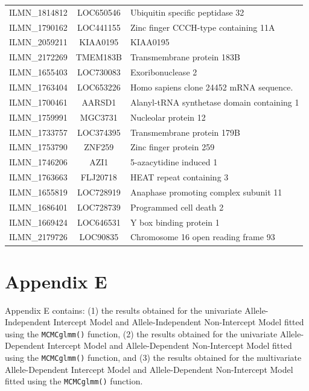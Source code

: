 \begin{xltabular}[!htb]{\textwidth}{|c|c|X|}
  ILMN\_1814812 & LOC650546 & Ubiquitin specific peptidase 32 \\ 
  ILMN\_1790162 & LOC441155 & Zinc finger CCCH-type containing 11A \\ 
  ILMN\_2059211 & KIAA0195 & KIAA0195 \\ 
  ILMN\_2172269 & TMEM183B & Transmembrane protein 183B \\ 
  ILMN\_1655403 & LOC730083 & Exoribonuclease 2 \\ 
  ILMN\_1763404 & LOC653226 & Homo sapiens clone 24452 mRNA sequence. \\ 
  ILMN\_1700461 & AARSD1 & Alanyl-tRNA synthetase domain containing 1 \\ 
  ILMN\_1759991 & MGC3731 & Nucleolar protein 12 \\ 
  ILMN\_1733757 & LOC374395 & Transmembrane protein 179B \\ 
  ILMN\_1753790 & ZNF259 & Zinc finger protein 259 \\ 
  ILMN\_1746206 & AZI1 & 5-azacytidine induced 1 \\ 
  ILMN\_1763663 & FLJ20718 & HEAT repeat containing 3 \\ 
  ILMN\_1655819 & LOC728919 & Anaphase promoting complex subunit 11 \\ 
  ILMN\_1686401 & LOC728739 & Programmed cell death 2 \\ 
  ILMN\_1669424 & LOC646531 & Y box binding protein 1 \\ 
  ILMN\_2179726 & LOC90835 & Chromosome 16 open reading frame 93 \\ 

   \hline
\end{xltabular}
\clearpage

\section*{Appendix E}
\renewcommand{\thefigure}{E\arabic{figure}}
\renewcommand{\thetable}{E\arabic{table}}
\setcounter{figure}{0}
\setcounter{table}{0}

{}


Appendix E contains: (1) the results obtained for the univariate Allele-Independent Intercept Model and Allele-Independent Non-Intercept Model fitted using the \texttt{MCMCglmm()} function, (2) the results obtained for the univariate Allele-Dependent Intercept Model and Allele-Dependent Non-Intercept Model fitted using the \texttt{MCMCglmm()} function, and (3) the results obtained for the multivariate Allele-Dependent Intercept Model and Allele-Dependent Non-Intercept Model fitted using the \texttt{MCMCglmm()} function.

